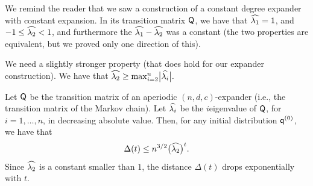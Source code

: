 We remind the reader that we saw a construction of a constant degree
expander with constant expansion. In its transition matrix $\mathsf{Q}$,
we have that $\widehat{\lambda_{1}} = 1$, and $-1 \leq \widehat{\lambda_{2}} <1$, and furthermore
the  $\widehat{\lambda_{1}} - \widehat{\lambda_{2}}$ was a constant (the two
properties are equivalent, but we proved only one direction of this).

We need a slightly stronger property (that does hold for our expander
construction). We have that
\begin{math}
    \widehat{\lambda_{2}} \geq \max_{i=2}^n \bigl|\widehat{\lambda_{i}}\bigr|.
\end{math}


\begin{theorem}
    Let $\mathsf{Q}$ be the transition matrix of an aperiodic
    $(n,d,c)$-expander (i.e., the transition matrix of the Markov
    chain).  Let $\widehat{\lambda_{i}}$ be the $i$\th eigenvalue of $\mathsf{Q}$, for
    $i=1,\ldots, n$, in decreasing absolute value. Then, for any
    initial distribution $\mathbf{\mathsf{q}}^{(0)}$, we have that
    \begin{equation*}
        \Delta(t) \leq n^{3/2} \bigl( \widehat{\lambda_{2}} \bigr)^t.
    \end{equation*}
    Since $\widehat{\lambda_{2}}$ is a constant smaller than $1$, the distance
    $\Delta(t)$ drops exponentially with $t$.
\end{theorem}

